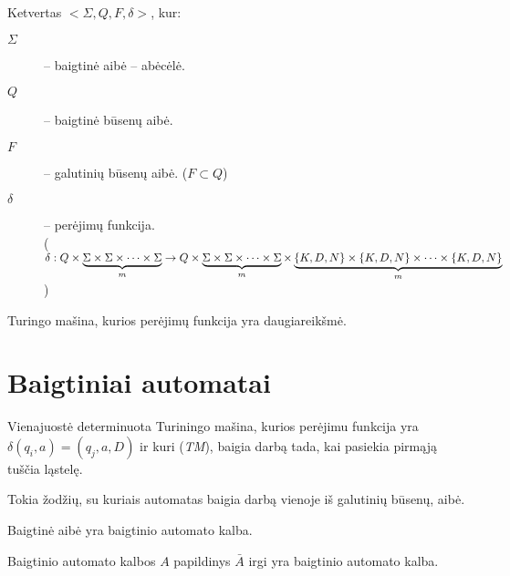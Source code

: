 \begin{defn}
  Ketvertas $<\Sigma,Q,F,\delta>$, kur:
  \begin{description}
    \item[$\Sigma$] – baigtinė aibė – abėcėlė.
    \item[$Q$] – baigtinė būsenų aibė.
    \item[$F$] – galutinių būsenų aibė. ($F \subset Q$)
    \item[$\delta$] – perėjimų funkcija. \\
      ($\delta: Q \times \underbrace{\Sigma \times \Sigma \times \cdots%
        \times \Sigma}_{m} \to Q \times \underbrace{%
          \Sigma \times \Sigma \times \cdots \times \Sigma}_{m}%
        \times \underbrace{
          \{K,D,N\} \times \{K,D,N\} \times \cdots \times \{K,D,N\}}_{m}$)
  \end{description}
\end{defn}

\begin{defn}
  Turingo mašina, kurios perėjimų funkcija yra daugiareikšmė.
\end{defn}


\section{Baigtiniai automatai}

\begin{defn}
  Vienajuostė determinuota Turiningo mašina, kurios perėjimu funkcija
  yra $\delta(q_i, a) = (q_j, a, D)$ ir kuri (\emph{TM}), baigia darbą
  tada, kai pasiekia pirmąją tuščia ląstelę.
\end{defn}

\begin{defn}
  Tokia žodžių, su kuriais automatas baigia darbą vienoje iš galutinių 
  būsenų, aibė.
\end{defn}

\begin{prop}
  Baigtinė aibė yra baigtinio automato kalba.
\end{prop}

\begin{prop}
  Baigtinio automato kalbos $A$ papildinys $\bar{A}$ irgi yra baigtinio
  automato kalba.
\end{prop}


